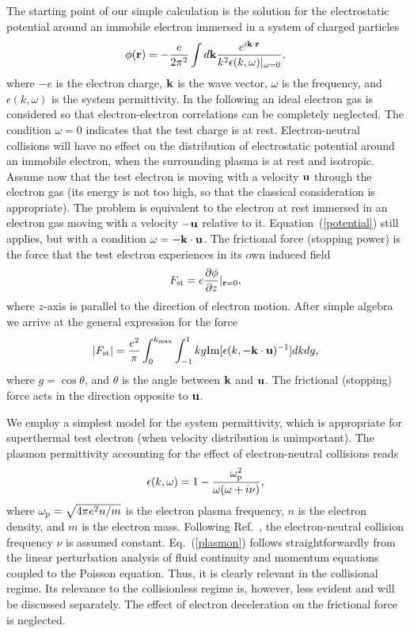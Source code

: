 \documentclass[twocolumn, 
  aps, prl,
  amsmath,amssymb,
  ]{revtex4-1}
\begin{document}
The starting point of our simple calculation is the solution for the electrostatic potential around an immobile electron immersed in a system of charged particles 
\begin{equation}\label{potential}
\phi({\bf r})=-\frac{e}{2\pi^2}\int d{\bf k}\frac{e^{i{\bf k} \cdot {\bf r}}}{k^2\epsilon(k,\omega)|_{\omega=0}},
\end{equation}       
where $-e$ is the electron charge, ${\bf k}$ is the wave vector, $\omega$ is the frequency, and $\epsilon(k,\omega)$ is the system permittivity. In the following an ideal electron gas is considered so that electron-electron correlations can be completely neglected. The condition $\omega=0$ indicates that the test charge is at rest. Electron-neutral collisions will have no effect on the distribution of electrostatic potential around an immobile electron, when the surrounding plasma is at rest and isotropic. Assume now that the test electron is moving with a velocity ${\bf u}$ through the electron gas (its energy is not too high, so that the classical consideration is appropriate). The problem is equivalent to the electron at rest immersed in an electron gas moving with a velocity $-{\bf u}$ relative to it. Equation~(\ref{potential}) still applies, but with a condition $\omega = -{\bf k}\cdot {\bf u}$. The frictional force (stopping power) is the force that the test electron experiences in its own induced field
\begin{equation}
F_{\rm st}=e \frac{\partial \phi}{\partial z}|_{{\bf r}=0},
\end{equation}
where $z$-axis is parallel to the direction of electron motion.     
After simple algebra we arrive at the general expression for the force
\begin{equation}\label{force}
|F_{\rm st}|=\frac{e^2}{\pi}\int_0^{k_{\max}}\int_{-1}^{1}kg {\rm Im}[\epsilon(k,-{\bf k}\cdot {\bf u})^{-1}]dkdg,
\end{equation}
where $g=\cos\theta$, and $\theta$ is the angle between ${\bf k}$ and ${\bf u}$. The frictional (stopping) force acts in the direction opposite to ${\bf u}$. 

We employ a simplest model for the system permittivity, which is appropriate for superthermal test electron (when velocity distribution is unimportant). The plasmon permittivity accounting for the effect of electron-neutral collisions reads 
\begin{equation}\label{plasmon}
\epsilon(k,\omega)= 1-\frac{\omega_{\rm p}^2}{\omega(\omega+i\nu)},
\end{equation}
where $\omega_{\rm p}=\sqrt{4\pi e^2 n/m}$ is the electron plasma frequency, $n$ is the electron density, and $m$ is the electron mass. Following Ref.~\cite{HagelaarPRL2019}, the electron-neutral collision frequency $\nu$ is assumed constant.  Eq.~(\ref{plasmon}) follows straightforwardly from the linear perturbation analysis of fluid continuity and momentum equations coupled to the Poisson equation. Thus, it is clearly relevant in the collisional regime. Its relevance to the collisionless regime is, however, less evident and will be discussed separately. The effect of electron deceleration on the frictional force~\cite{KompaneetsPoP2014} is neglected. 
\end{document}
